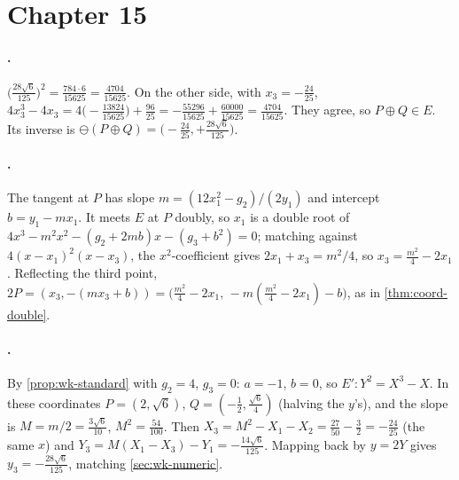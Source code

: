 \section{Chapter 15}
\label{sec:soln-ch15}

\paragraph{.}
\(\bigl(\tfrac{28\sqrt6}{125}\bigr)^2 = \tfrac{784 \cdot 6}{15625} =
\tfrac{4704}{15625}\). On the other side, with \(x_3 = -\tfrac{24}{25}\),
\(4x_3^3 - 4x_3 = 4\bigl(-\tfrac{13824}{15625}\bigr) + \tfrac{96}{25}
= -\tfrac{55296}{15625} + \tfrac{60000}{15625} = \tfrac{4704}{15625}\). They agree,
so \(P \oplus Q \in E\). Its inverse is \(\ominus(P\oplus Q) =
\bigl(-\tfrac{24}{25}, +\tfrac{28\sqrt6}{125}\bigr)\).

\paragraph{.}
The tangent at \(P\) has slope \(m = (12x_1^2 - g_2)/(2y_1)\) and intercept
\(b = y_1 - m x_1\). It meets \(E\) at \(P\) doubly, so \(x_1\) is a double root of
\(4x^3 - m^2 x^2 - (g_2 + 2mb)x - (g_3 + b^2) = 0\); matching against
\(4(x - x_1)^2(x - x_3)\), the \(x^2\)-coefficient gives \(2x_1 + x_3 = m^2/4\),
so \(x_3 = \tfrac{m^2}{4} - 2x_1\). Reflecting the third point,
\(2P = (x_3, -(m x_3 + b)) = \bigl(\tfrac{m^2}{4} - 2x_1,\, -m(\tfrac{m^2}{4} -
2x_1) - b\bigr)\), as in \cref{thm:coord-double}.

\paragraph{.}
By \cref{prop:wk-standard} with \(g_2 = 4\), \(g_3 = 0\): \(a = -1\), \(b = 0\), so
\(E' : Y^2 = X^3 - X\). In these coordinates \(P = (2, \sqrt6)\),
\(Q = (-\tfrac12, \tfrac{\sqrt6}{4})\) (halving the \(y\)'s), and the slope is
\(M = m/2 = \tfrac{3\sqrt6}{10}\), \(M^2 = \tfrac{54}{100}\). Then
\(X_3 = M^2 - X_1 - X_2 = \tfrac{27}{50} - \tfrac32 = -\tfrac{24}{25}\) (the same
\(x\)) and \(Y_3 = M(X_1 - X_3) - Y_1 = -\tfrac{14\sqrt6}{125}\). Mapping back by
\(y = 2Y\) gives \(y_3 = -\tfrac{28\sqrt6}{125}\), matching \cref{sec:wk-numeric}.

